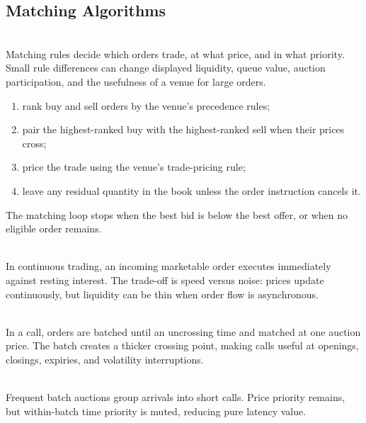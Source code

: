 \subsection{Matching Algorithms}

\begin{principle} \\
Matching rules decide which orders trade, at what price, and in what priority. Small rule differences can change displayed liquidity, queue value, auction participation, and the usefulness of a venue for large orders.
\end{principle}

\begin{process} 
\begin{enumerate}[label=\roman*.]
\setlength{\itemsep}{0pt}
\item rank buy and sell orders by the venue's precedence rules;
\item pair the highest-ranked buy with the highest-ranked sell when their prices cross;
\item price the trade using the venue's trade-pricing rule;
\item leave any residual quantity in the book unless the order instruction cancels it.
\end{enumerate}
The matching loop stops when the best bid is below the best offer, or when no eligible order remains.
\end{process}

\begin{mechanism} \\
In continuous trading, an incoming marketable order executes immediately against resting interest. The trade-off is speed versus noise: prices update continuously, but liquidity can be thin when order flow is asynchronous.
\end{mechanism}

\begin{mechanism} \\
In a call, orders are batched until an uncrossing time and matched at one auction price. The batch creates a thicker crossing point, making calls useful at openings, closings, expiries, and volatility interruptions.
\end{mechanism}

\begin{mechanism} \\
Frequent batch auctions group arrivals into short calls. Price priority remains, but within-batch time priority is muted, reducing pure latency value.
\end{mechanism}

